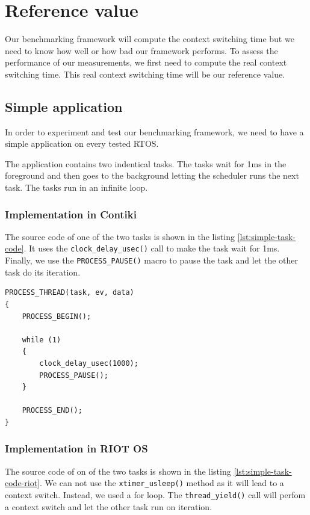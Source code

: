 \section{Reference value}

Our benchmarking framework will compute the context switching time but we need to know how well or how bad our framework performs.
To assess the performance of our measurements, we first need to compute the real context switching time.
This real context switching time will be our reference value.

\subsection{Simple application}
In order to experiment and test our benchmarking framework, we need to have a simple application on every tested RTOS.

The application contains two indentical tasks.
The tasks wait for 1ms in the foreground and then goes to the background letting the scheduler runs the next task.
The tasks run in an infinite loop.

\subsubsection{Implementation in Contiki}
The source code of one of the two tasks is shown in the listing \ref{lst:simple-task-code}.
It uses the \texttt{clock\_delay\_usec()} call to make the task wait for 1ms.
Finally, we use the \texttt{PROCESS\_PAUSE()} macro to pause the task and let the other task do its iteration.

\begin{lstlisting}[style=CStyle, float, label={lst:simple-task-code}, caption={Source code of a task implemented in Contiki for the simple application}]
PROCESS_THREAD(task, ev, data)
{
    PROCESS_BEGIN();

    while (1)
    {
        clock_delay_usec(1000);
        PROCESS_PAUSE();
    }

    PROCESS_END();
}
\end{lstlisting}

\subsubsection{Implementation in RIOT OS}
The source code of on of the two tasks is shown in the listing \ref{lst:simple-task-code-riot}.
We can not use the \texttt{xtimer\_usleep()} method as it will lead to a context switch.
Instead, we used a for loop.
The \texttt{thread\_yield()} call will perfom a context switch and let the other task run on iteration.


